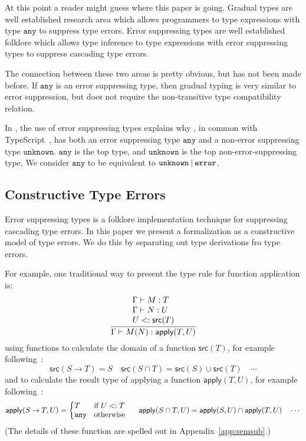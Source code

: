 \documentclass[acmsmall,review,screen]{acmart}
\makeatletter
\newcommand{\infer}[2]{\frac{\displaystyle\begin{array}{@{}l@{}}#1\end{array}}{\displaystyle#2}}
\newcommand{\ANY}{\mathtt{any}}
\newcommand{\UNKNOWN}{\mathtt{unknown}}
\newcommand{\ERROR}{\mathtt{error}}
\newcommand{\APPLY}{\mathsf{apply}}
\newcommand{\SRC}{\mathsf{src}}
\newcommand{\UNION}{\mathbin{\mathtt{\char`\|}}}
\newcommand{\fun}{\mathbin{\rightarrow}}
\makeatother
\begin{document}
At this point a reader might guess where this paper is going.  Gradual
types are well established research area which allows programmers
to type expressions with type $\ANY$ to suppress type errors.  Error
suppressing types are well established folklore which
allows type inference to type expressions with error suppressing types
to suppress cascading type errors.

The connection between these two areas is pretty obvious, but has not
been made before. If $\ANY$ is an error suppressing type, then
gradual typing is very similar to error suppression, but does
not require the non-transitive type compatibility relation.

In , the use of error suppressing types explains why
, in common with TypeScript~\cite{TypeScript}, has both an
error suppressing type $\ANY$ and a non-error suppressing type
$\UNKNOWN$. $\ANY$ is the top type, and $\UNKNOWN$ is the top
non-error-suppressing type. We consider $\ANY$ to be equivalent to
$\UNKNOWN \UNION \ERROR$.

\subsection{Constructive Type Errors}

Error suppressing types is a folklore implementation technique
for suppressing cascading type errors. In this paper we present
a formalization as a constructive model of type errors. We do this by
separating out type derivations fro type errors.

For example, one traditional way to present the type rule for function
application is:
\[
  \infer{
    \Gamma \vdash M : T \\
    \Gamma \vdash N : U \\
    U <: \SRC(T)
  }{
    \Gamma \vdash M(N) : \APPLY(T,U)
  }
\]
using functions to calculate the domain of a function $\SRC(T)$, for example
following~\cite[\S5.2]{Ken21:DownDirty}:
\[
  \SRC(S \fun T) = S
\quad
  \SRC(S \cap T) = \SRC(S) \cup \SRC(T)
\quad
  \cdots
\]
and to calculate the result type of applying a function $\APPLY(T,U)$,
for example following~\cite[\S5.3]{Ken21:DownDirty}:
\[ 
  \APPLY(S \fun T, U) =
  \left\{\begin{array}{@{}ll}
    T & \text{if } U <: T \\
    \ANY & \text{otherwise}
  \end{array}\right.
\quad
  \APPLY(S \cap T, U) = \APPLY(S, U) \cap \APPLY(T, U)
\quad
  \cdots
\]
(The details of these function are spelled out in Appendix~\ref{app:semsub}.)
\end{document}
